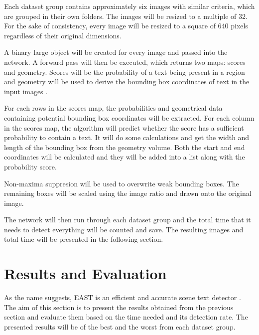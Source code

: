 \documentclass[10pt, a4paper]{article}
\begin{document}
Each dataset group contains approximately six images with similar criteria, which are grouped in their own folders. The images will be resized to a multiple of 32. For the sake of consistency, every image will be resized to a square of 640 pixels regardless of their original dimensions.

A binary large object will be created for every image and passed into the network. A forward pass will then be executed, which returns two maps: scores and geometry. 
Scores will be the probability of a text being present in a region and geometry will be used to derive the bounding box coordinates of text in the input images \citep{Rosebrockeast}.

For each rows in the scores map, the probabilities and geometrical data containing potential bounding box coordinates will be extracted.
For each column in the scores map, the algorithm will predict whether the score has a sufficient probability to contain a text. It will do some calculations and get the width and length of the bounding box from the geometry volume. Both the start and end coordinates will be calculated and they will be added into a list along with the probability score.

Non-maxima suppresion will be used to overwrite weak bounding boxes. The remaining boxes will be scaled using the image ratio and drawn onto the original image.

The network will then run through each dataset group and the total time that it needs to detect everything will be counted and save.
The resulting images and total time will be presented in the following section.

\clearpage
\section{Results and Evaluation} %
\label{sec:evaluation}
As the name suggests, EAST is an efficient and accurate scene text detector \citep{EastZhouEtAl}. The aim of this section is to present the results obtained from the previous section and evaluate them based on the time needed and its detection rate. The presented results will be of the best and the worst from each dataset group.
\end{document}
